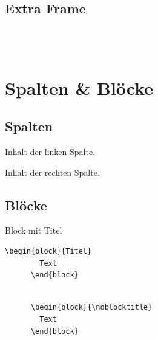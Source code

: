 \subsection{Extra Frame}
\begin{frame}[fragile]{\subsecname}

  \begin{lstlisting}[gobble=4]
    % Option [fragile] ist erforderlich!

    
  \end{lstlisting}

\end{frame}

\section{Spalten \& Blöcke}

\subsection{Spalten}
\begin{frame}{\subsecname}

  \begin{minipage}[t]{0.5\textwidth}
    \par\medskip
    Inhalt der linken Spalte.
  \end{minipage}%
  \begin{minipage}[t]{0.5\textwidth}
    \par\medskip
    Inhalt der rechten Spalte.
  \end{minipage}

\end{frame}

\subsection{Blöcke}
\begin{frame}[fragile]{\subsecname}

  \begin{block}{Block mit Titel}
    \begin{lstlisting}[gobble=6]
      \begin{block}{Titel}
        Text
      \end{block}
    \end{lstlisting}
  \end{block}

  \begin{block}{\noblocktitle}
    \begin{lstlisting}[gobble=6]
      % Block ohne Titel

      \begin{block}{\noblocktitle}
        Text
      \end{block}
    \end{lstlisting}
  \end{block}

\end{frame}

